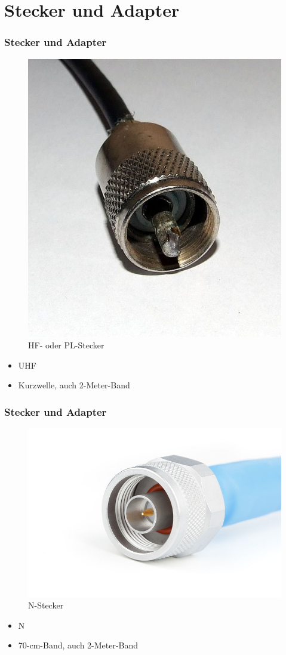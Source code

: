 \section*{Stecker und Adapter}
\begin{frame}
\frametitle{Stecker und Adapter}
\begin{center}
  \begin{figure}
	\includegraphics[width=.6\textwidth,height=.6\textheight,keepaspectratio]{e10/pl.jpg}
	\caption{HF- oder PL-Stecker\cite{pl}}
      \end{figure}
	\begin{itemize}
		\item UHF
		\item Kurzwelle, auch 2-Meter-Band
	\end{itemize}
\end{center}
\end{frame}

\begin{frame}
\frametitle{Stecker und Adapter}
\begin{center}
  \begin{figure}
	\includegraphics[width=.6\textwidth,height=.6\textheight,keepaspectratio]{e10/n.jpg}
	\caption{N-Stecker\cite{n}}
      \end{figure}
	\begin{itemize}
		\item N
		\item 70-cm-Band, auch 2-Meter-Band
	\end{itemize}	 
\end{center}
\end{frame}


